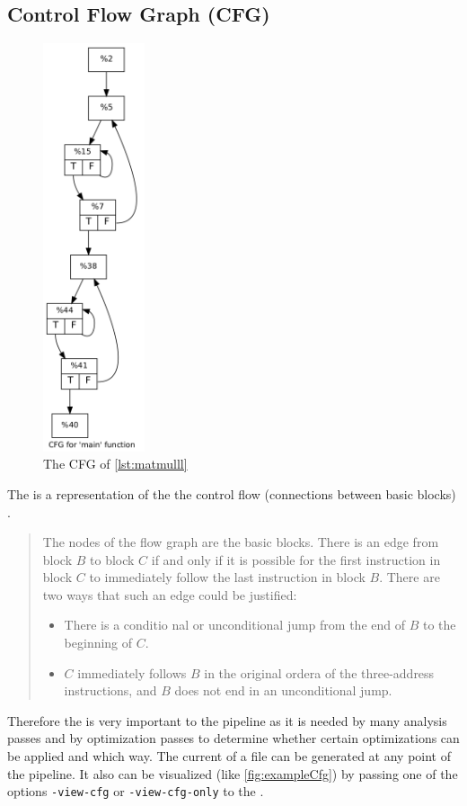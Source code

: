 \subsection{Control Flow Graph (CFG)}\label{subsec:cfg}
\begin{figure}
    \caption{The CFG of \autoref{lst:matmulll}}
    \label{fig:exampleCfg}
    \includegraphics[height=12cm]{gfx/matmulCfg.png}
\end{figure}
The \cfg is a representation of the the control flow (connections between basic blocks) \cite[chapter 8.4.3, p.~529]{Drachenbuch}.

\begin{quote}
    The nodes of the flow graph are the basic blocks.
    There is an edge from block \(B\) to block \(C\) if and only if it is possible for the first instruction in block \(C\) to immediately follow the last instruction in block \(B\).
    There are two ways that such an edge could be justified:
    \begin{itemize}
        \item There is a conditio nal or unconditional jump from the end of \(B\) to the beginning of \(C\).
        \item \(C\) immediately follows \(B\) in the original ordera of the three-address instructions, and \(B\) does not end in an unconditional jump.
    \end{itemize}
\end{quote}
Therefore the \cfg is very important to the pipeline as it is needed by many analysis passes and by optimization passes to determine whether certain optimizations can be applied and which way.
The current \cfg of a \llvmir file can be generated at any point of the pipeline.
It also can be visualized (like \autoref{fig:exampleCfg}) by passing one of the options \texttt{-view-cfg} or \texttt{-view-cfg-only} to the \opt.

